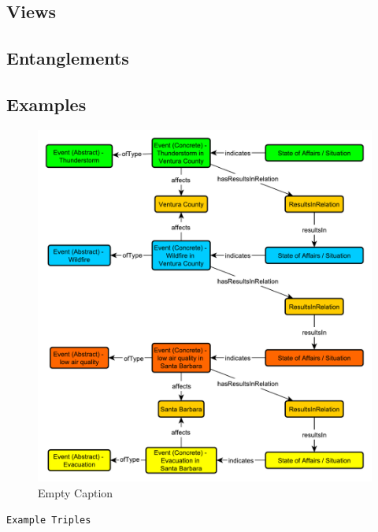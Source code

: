 \subsection{Views}
\label{ssec:views}


\subsection{Entanglements}
\label{ssec:entanglements}


\subsection{Examples}
\label{ssec:examples}
\begin{figure}[h!]
  \begin{center}
    \includegraphics[width=\textwidth]{resources/causal-event-example.pdf}
  \end{center}
  \caption{Empty Caption}
  \label{fig:ov}
\end{figure}\begin{verbatim}
Example Triples
\end{verbatim}


